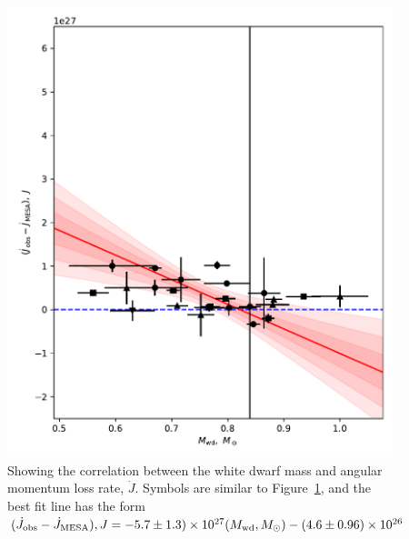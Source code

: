 
\begin{figure}
    \centering
    \includegraphics[width=\textwidth]{figures/results/Mdot/Mwd_Jdot_ex.pdf}
    \caption{Showing the correlation between the white dwarf mass and angular momentum loss rate, $\dot J$. Symbols are similar to Figure~\ref{fig:discussion:white dwarf mass vs Jdot fit}, and the best fit line has the form $(\dot J_{\rm obs} - \dot J_{\rm MESA}), J = -5.7\pm1.3) \times 10^{27}(M_{\rm wd}, M_\odot) - (4.6\pm0.96)\times10^{26}$}
    \label{fig:discussion:white dwarf mass vs Jdot fit}
\end{figure}


